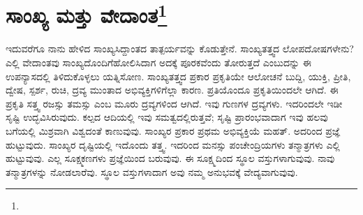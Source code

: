 
\chapter[ಸಾಂಖ್ಯ ಮತ್ತು ವೇದಾಂತ]{ಸಾಂಖ್ಯ ಮತ್ತು ವೇದಾಂತ\protect\footnote{}}

ಇದುವರೆಗೂ ನಾನು ಹೇಳಿದ ಸಾಂಖ್ಯಸಿದ್ದಾಂತದ ತಾತ್ಪರ್ಯವನ್ನು ಕೊಡುತ್ತೇನೆ. ಸಾಂಖ್ಯತತ್ತ್ವದ ಲೋಪದೋಷಗಳೇನು? ಎಲ್ಲಿ ವೇದಾಂತವು ಸಾಂಖ್ಯದೊಂದಿಗೆ\break ಹೋಲಿಸಿದಾಗ ಅದಕ್ಕೆ ಪೂರಕವೆಂದು ತೋರುತ್ತದೆ ಎಂಬುದನ್ನು ಈ ಉಪನ್ಯಾಸದಲ್ಲಿ ತಿಳಿದುಕೊಳ್ಳಲು ಯತ್ನಿಸೋಣ. ಸಾಂಖ್ಯತತ್ತ್ವದ ಪ್ರಕಾರ ಪ್ರಕೃತಿಯೇ ಆಲೋಚನೆ ಬುದ್ದಿ, ಯುಕ್ತಿ, ಪ್ರೀತಿ, ದ್ವೇಷ, ಸ್ಪರ್ಶ, ರುಚಿ, ದ್ರವ್ಯ ಮುಂತಾದ ಅಭಿವ್ಯಕ್ತಿಗಳಿಗೆಲ್ಲಾ ಕಾರಣ. ಪ್ರತಿಯೊಂದೂ ಪ್ರಕೃತಿಯಿಂದಲೇ ಆಗಿದೆ. ಈ ಪ್ರಕೃತಿ ಸತ್ತ್ವ ರಜಸ್ಸು ತಮಸ್ಸು ಎಂಬ ಮೂರು ದ್ರವ್ಯಗಳಿಂದ ಆಗಿದೆ. ಇವು ಗುಣಗಳ ದ್ರವ್ಯಗಳು. ಇದರಿಂದಲೇ ಇಡೀ ಸೃಷ್ಟಿ ಉದ್ಭವಿಸಿರುವುದು. ಕಲ್ಪದ ಆದಿಯಲ್ಲಿ ಇವು ಸಮತ್ವದಲ್ಲಿರುತ್ತವೆ; ಸೃಷ್ಟಿ ಪ್ರಾರಂಭವಾದಾಗ ಇವು ಹಲವು ಬಗೆಯಲ್ಲಿ ಮಿಶ್ರವಾಗಿ ವಿಶ್ವದಂತೆ ಕಾಣುವುವು. ಸಾಂಖ್ಯರ ಪ್ರಕಾರ ಪ್ರಥಮ ಅಭಿವ್ಯಕ್ತಿಯೆ ಮಹತ್. ಅದರಿಂದ ಪ್ರಜ್ಞೆ ಹುಟ್ಟುವುದು. ಸಾಂಖ್ಯರ ದೃಷ್ಟಿಯಲ್ಲಿ ಇದೊಂದು ತತ್ತ್ವ. ಇದರಿಂದ ಮನಸ್ಸು ಪಂಚೇಂದ್ರಿಯಗಳು ತನ್ಮಾತ್ರಗಳು ಎಲ್ಲಿ ಹುಟ್ಟುವುವು. ಎಲ್ಲ ಸೂಕ್ಷ್ಮಕಣಗಳು ಪ್ರಜ್ಞೆಯಿಂದ ಬರುವುವು. ಈ ಸೂಕ್ಷ್ಮದಿಂದ ಸ್ಥೂಲ ವಸ್ತುಗಳಾಗುವುವು. ನಾವು ತನ್ಮಾತ್ರಗಳನ್ನು ನೋಡಲಾರೆವು. ಸ್ಥೂಲ ವಸ್ತುಗಳಾದಾಗ ಅವು ನಮ್ಮ ಅನುಭವಕ್ಕೆ ವೇದ್ಯವಾಗುವುವು.

